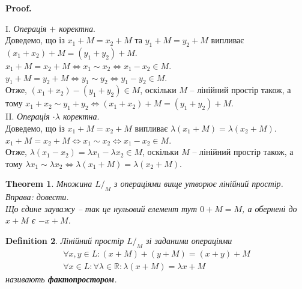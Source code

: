 \documentclass[a4paper, 10pt]{article}
\makeatletter
\theoremstyle{theoremdd}
\newtheorem{theorem}{Theorem}[subsection]
\newtheorem{definition}[theorem]{Definition}
\renewenvironment{proof}[1][Proof.\\]{\par
\pushQED{\hfill \qed}%
\normalfont \topsep6\p@\@plus6\p@\relax
\trivlist
\item\relax
{\bfseries
#1\@addpunct{.}}\hspace\labelsep\ignorespaces
}{%
\popQED\endtrivlist\@endpefalse
}
\makeatother
\begin{document}
	\begin{proof}
	I. \textit{Операція $+$ коректна}.\\
	Доведемо, що із $x_1+M=x_2+M$ та $y_1+M=y_2+M$ випливає $(x_1+x_2)+M=(y_1+y_2)+M$.\\
	$x_1+M=x_2+M \iff x_1 \sim x_2 \iff x_1 - x_2 \in M$.\\
	$y_1+M=y_2+M \iff y_1 \sim y_2 \iff y_1 - y_2 \in M$.\\
	Отже, $(x_1+x_2)-(y_1+y_2) \in M$, оскільки $M$ -- лінійний простір також, а тому $x_1+x_2 \sim y_1+y_2 \iff (x_1+x_2)+M=(y_1+y_2)+M$.
	\bigskip \\
	II. \textit{Операція $\cdot \lambda$ коректна}.\\
	Доведемо, що із $x_1+M=x_2+M$ випливає $\lambda(x_1+M) = \lambda(x_2+M)$.\\
	$x_1+M=x_2+M \iff x_1 \sim x_2 \iff x_1 - x_2 \in M$.\\
	Отже, $\lambda(x_1-x_2) = \lambda x_1 - \lambda x_2 \in M$, оскільки $M$ -- лінійний простір також, а тому $\lambda x_1 \sim \lambda x_2 \iff \lambda(x_1+M) = \lambda(x_2+M)$.
	\end{proof}
	
	\begin{theorem}
	Множина $L/_{M}$ з операціями вище утворює лінійний простір.\\
	\textit{Вправа: довести.}
	\bigskip \\
	Що єдине зауважу -- так це нульовий елемент тут $0+M=M$, а обернені до $x+M$ є $-x+M$.
	\end{theorem}
		
	\begin{definition}
	Лінійний простір $L/_{M}$ зі заданими операціями
	\begin{align*}
	\forall x,y \in L: (x+M) + (y+M) = (x+y) + M \\
	\forall x \in L: \forall \lambda \in \mathbb{R}: \lambda( x+M) = \lambda x + M
	\end{align*}
	називають \textbf{фактопростором}.
	\end{definition}
	
\end{document}
